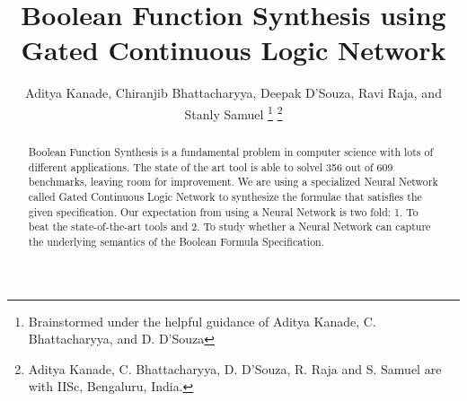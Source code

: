 \documentclass[letterpaper, 10 pt, conference]{ieeeconf} %
\title{%
Boolean Function Synthesis using Gated Continuous Logic Network
}
\author{
Aditya Kanade,
Chiranjib Bhattacharyya,
Deepak D'Souza,
Ravi Raja, and
Stanly Samuel
%
%
\thanks{
Brainstormed under the helpful guidance of 
Aditya Kanade,	
C. Bhattacharyya, and
D. D'Souza
}
\thanks{
  Aditya Kanade,
	C. Bhattacharyya,
D. D'Souza,
R. Raja and
S. Samuel are with IISc, Bengaluru, India.
}
}
\begin{document}
\maketitle
\thispagestyle{empty}
\pagestyle{empty}


\begin{abstract}
Boolean Function Synthesis is a fundamental problem in computer science with lots of different applications. The state of the art tool is able to solvel 356 out of 609 benchmarks, leaving room for improvement. We are using a specialized Neural Network called Gated Continuous Logic Network to synthesize the formulae that satisfies the given specification. Our expectation from using a Neural Network is two fold: 1. To beat the state-of-the-art tools and 2. To study whether a Neural Network can capture the underlying semantics of the Boolean Formula Specification.

\end{abstract}	















 




% 



%
\end{document}
